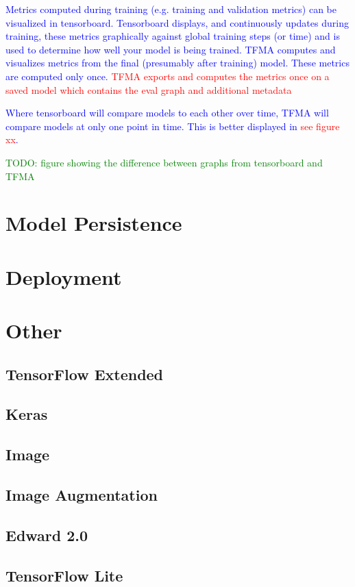 \textcolor{blue}{Metrics computed during training (e.g. training and validation metrics) can be visualized in tensorboard. Tensorboard displays, and continuously updates during training, these metrics graphically against global training steps (or time) and is used to determine how well your model is being trained. TFMA computes and visualizes metrics from the final (presumably after training) model. These metrics are computed only once. \textcolor{red}{TFMA exports and computes the metrics once on a saved model which contains the eval graph and additional metadata}}

\textcolor{blue}{Where tensorboard will compare models to each other over time, TFMA will compare models at only one point in time. This is better displayed in \textcolor{red}{see figure xx}.}

\textcolor{green}{TODO: figure showing the difference between graphs from tensorboard and TFMA}








\section{Model Persistence}






\section{Deployment}




\section{Other}



\subsection{TensorFlow Extended}

\subsection{Keras}

\subsection{Image}

\subsection{Image Augmentation}

\subsection{Edward 2.0}

\subsection{TensorFlow Lite}
